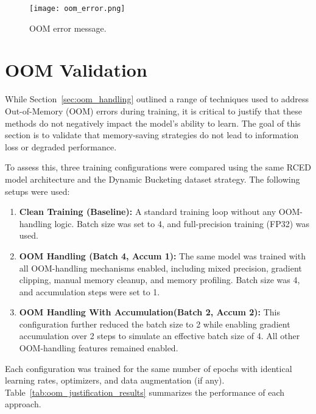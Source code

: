 \begin{figure}[H]
    \centering
    \texttt{[image: oom\_error.png]}
    \caption{\label{fig:oom_error} OOM error message.}
\end{figure}

\section{OOM Validation}
\label{sec:oom_validation}

While Section~\ref{sec:oom_handling} outlined a range of techniques used to address Out-of-Memory (OOM) errors during training, it is critical to justify that these methods do not negatively impact the model’s ability to learn. The goal of this section is to validate that memory-saving strategies do not lead to information loss or degraded performance.

To assess this, three training configurations were compared using the same RCED model architecture and the Dynamic Bucketing dataset strategy. The following setups were used:

\begin{enumerate}
    \item \textbf{Clean Training (Baseline):} A standard training loop without any OOM-handling logic. Batch size was set to 4, and full-precision training (FP32) was used.
    
    \item \textbf{OOM Handling (Batch 4, Accum 1):} The same model was trained with all OOM-handling mechanisms enabled, including mixed precision, gradient clipping, manual memory cleanup, and memory profiling. Batch size was 4, and accumulation steps were set to 1.
    
    \item \textbf{OOM Handling With Accumulation(Batch 2, Accum 2):} This configuration further reduced the batch size to 2 while enabling gradient accumulation over 2 steps to simulate an effective batch size of 4. All other OOM-handling features remained enabled.
\end{enumerate}

Each configuration was trained for the same number of epochs with identical learning rates, optimizers, and data augmentation (if any). Table~\ref{tab:oom_justification_results} summarizes the performance of each approach.

